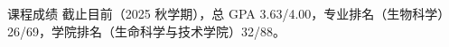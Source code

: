 \begin{rubric}{课程成绩}
\entry*[] 截止目前（2025 秋学期），总 GPA 3.63/4.00，专业排名（生物科学）26/69，学院排名（生命科学与技术学院）32/88。
\end{rubric}
